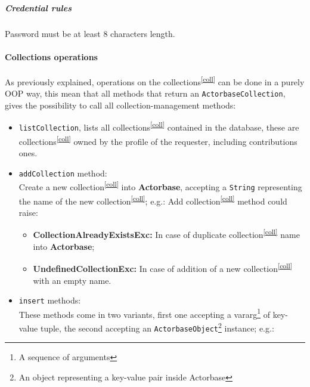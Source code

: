 \documentclass{scalatekids-article}
\begin{document}
\subparagraph{Credential rules}
Password must be at least 8 characters length.

\paragraph{Collections operations}

As previously explained, operations on the collections\textsuperscript{\ref{coll}} can be done in a purely
OOP way, this mean that all methods that return an \verb=ActorbaseCollection=,
gives the possibility to call all collection-management methods:
\begin{itemize}
\item \verb=listCollection=, lists all collections\textsuperscript{\ref{coll}}
  contained in the database, these are collections\textsuperscript{\ref{coll}}
  owned by the profile of the requester, including contributions ones.
\item \verb=addCollection= method:\\ Create a new collection\textsuperscript{\ref{coll}} into \textbf{Actorbase}, accepting a \verb=String=
  representing the name of the new collection\textsuperscript{\ref{coll}};
  e.g.:
  Add collection\textsuperscript{\ref{coll}} method could raise:
  \begin{itemize}
  \item \textbf{CollectionAlreadyExistsExc:} In case of duplicate collection\textsuperscript{\ref{coll}} name into \textbf{Actorbase};
  \item \textbf{UndefinedCollectionExc:} In case of addition of a new collection\textsuperscript{\ref{coll}} with an empty name.
  \end{itemize}
\item \verb=insert= methods:\\ These methods come in two variants, first one accepting
  a vararg\footnote{A sequence of arguments} of key-value tuple, the second
  accepting an
  \verb=ActorbaseObject=\footnote{An object representing a key-value pair inside Actorbase} instance;
  e.g.:

\end{itemize}
\end{document}
